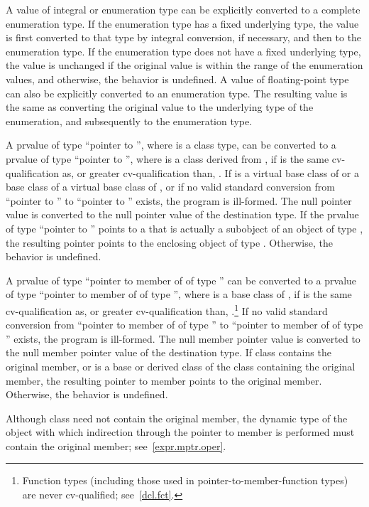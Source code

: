 \pnum
{}%
%
A value of integral or enumeration type can be explicitly converted to
a complete enumeration type.
If the enumeration type has a fixed underlying type,
the value is first converted to that type
by integral conversion, if necessary, and
then to the enumeration type.
If the enumeration type does not have a fixed underlying type,
the value is unchanged
if the original value is within the range
of the enumeration values, and
otherwise, the behavior is undefined.
A value of floating-point type can also be explicitly converted to an enumeration type.
The resulting value is the same as converting the original value to the
underlying type of the enumeration, and subsequently to
the enumeration type.

\pnum
{}%
%
A prvalue of type ``pointer to  '', where 
is a class type, can be converted to a prvalue of type ``pointer to
 '', where  is a class derived
from ,
if  is the same cv-qualification as,
or greater cv-qualification than, .
If  is a virtual base class of  or
a base class of a virtual base class of , or
if no valid standard conversion from ``pointer to ''
to ``pointer to '' exists, the program is ill-formed.
The null pointer value is converted
to the null pointer value of the destination type. If the prvalue of type
``pointer to  '' points to a  that is
actually a subobject of an object of type , the resulting
pointer points to the enclosing object of type . Otherwise, the
behavior is undefined.

\pnum
{}%
A prvalue of type ``pointer to member of  of type 
'' can be converted to a prvalue of type ``pointer to member of
 of type  '', where  is a base
class of ,
if  is the same cv-qualification
as, or greater cv-qualification than, .\footnote{Function types
(including those used in pointer-to-member-function
types) are never cv-qualified; see~\ref{dcl.fct}.}
If no valid standard conversion
from ``pointer to member of  of type ''
to ``pointer to member of  of type ''
exists, the program is ill-formed.
The null member pointer value is converted to the null
member pointer value of the destination type. If class 
contains the original member, or is a base or derived class of the class
containing the original member, the resulting pointer to member points
to the original member. Otherwise, the behavior is undefined.
\begin{note}
Although class  need not contain the original member, the
dynamic type of the object with which indirection through the pointer
to member is performed must contain the original member;
see~\ref{expr.mptr.oper}.
\end{note}

